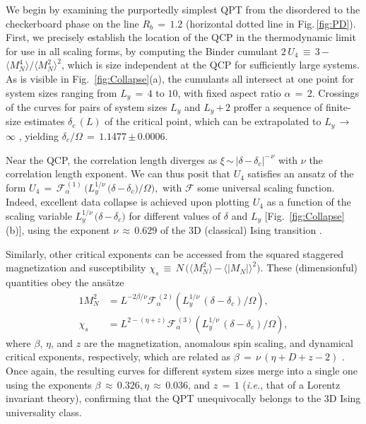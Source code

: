 \documentclass[prl,twocolumn,superscriptaddress,showpacs,amsmath,amstex,amssymb,citeautoscript]{revtex4-1}
\begin{document}
 

We begin by examining the purportedly simplest QPT  from the disordered to the checkerboard phase on the line $R_b$\,$=$\,$1.2$ (horizontal dotted line in Fig.\,\ref{fig:PD}). First, we precisely establish the location of the QCP in the thermodynamic limit for use in all scaling forms, by computing 
the Binder cumulant \cite{binder1981finite} $2\, U^{}_4$\,$\equiv$\,$3$\,$-$\,$\langle M_N^4\rangle/\langle M_N^2\rangle^2$,
which is size independent at the QCP for sufficiently large systems. As is visible in Fig.~\ref{fig:Collapse}(a), the cumulants all intersect at one point for system sizes ranging from $L_y$\,$=$\,$4$ to $10$, with fixed aspect ratio $\alpha$\,$=$\,$2$. Crossings of the curves for pairs of system sizes $L_y$ and $L_y$\,$+$\,$2$ proffer a sequence of finite-size estimates $\delta_c\,(L)$ of the critical point, which can be extrapolated to $L_y$\,$\rightarrow$\,$\infty$ \cite{qin2015multiplicative}, yielding $\delta_c/\Omega$\,$=$\,$1.1477$\,$\pm$\,$0.0006$.

Near the QCP, the correlation length diverges as $\xi$\,$\sim$\,$\lvert\delta$\,$-$\,$\delta_c\rvert^{-\,\nu}$ with $\nu$ the correlation length exponent.
We can thus posit that $U_4$ satisfies an ansatz of the form
$
U_4$\,$=$\,$\mathcal{F}^{\,(1)}_\alpha\,(L_y^{1/\nu}\,(\delta$\,$-$\,$\delta_c)/\Omega),
$
with $\mathcal{F}$ some universal scaling function. 
%
Indeed, excellent data collapse \cite{landau1976finite, binder1980phase, bhattacharjee2001measure} is achieved 
upon plotting $U_4$ as a function of the scaling variable $L_y^{1/\nu}$\,$(\delta$\,$-$\,$\delta_c)$ for different values of $\delta$ and $L_y$ [Fig.~\ref{fig:Collapse}(b)],
using the exponent $\nu$\,$\approx$\,$0.629$ of the 3D (classical) Ising transition \cite{hasenbusch1999critical, el2014solving,kos2016precision}.  

Similarly, other critical exponents can be accessed from the squared staggered magnetization and susceptibility 
$
\chi^{}_s$\,$\equiv$\,$N\,(\langle M_N^2\rangle$\,$-$\,$\langle\lvert M_N^{}\rvert\rangle^2).
$
These (dimensionful) quantities obey the ans\"{a}tze \cite{troyer1997critical}
\begin{alignat}{1}
M_N^2 &=  L^{-2\beta/\nu}\mathcal{F}^{\,(2)}_\alpha \left( L_y^{1/\nu}\,(\delta-\delta_c)/\Omega \right),\\
\chi^{}_s &=  L^{2-(\eta+z)}\mathcal{F}^{\,(3)}_\alpha \left( L_y^{1/\nu}\,(\delta-\delta_c)/\Omega \right),
\end{alignat}
where $\beta$, $\eta$, and $z$ are the magnetization, anomalous spin scaling, and dynamical critical exponents, respectively, which are related as $\beta$\,$=$\,$\nu\,(\eta+D+z-2)$ \cite{cardy1996scaling}. Once again, the resulting curves for different system sizes merge into a single one using the exponents $\beta$\,$\approx$\,$0.326$,\,$\eta$\,$\approx$\,$0.036$, and $z$\,$=$\,$1$ (\textit{i.e.}, that of a Lorentz invariant theory), confirming that the QPT unequivocally belongs to the 3D Ising universality class. 
\end{document}
